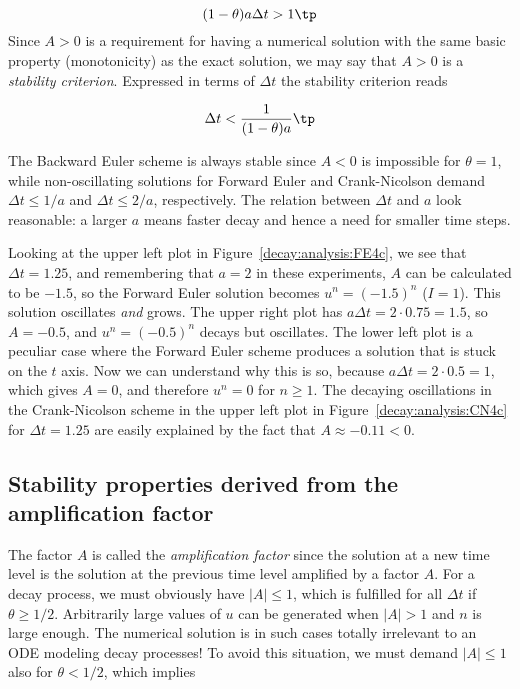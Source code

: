 \documentclass[graybox,sectrefs,envcountresetchap,open=right,final]{svmonodo}
\begin{document}
\begin{equation}
(1-\theta)a\Delta t > 1 \tp
\label{decay:th:stability}
\end{equation}
Since $A>0$ is a requirement for having a numerical solution with the
same basic property (monotonicity) as the exact solution, we may say
that $A>0$ is a \emph{stability criterion}. Expressed in terms of $\Delta t$
the stability criterion reads

\begin{equation}
\Delta t < \frac{1}{(1-\theta)a}\tp
\end{equation}

The Backward
Euler scheme is always stable since $A < 0$ is impossible for $\theta=1$, while
non-oscillating solutions for Forward Euler and Crank-Nicolson
demand $\Delta t\leq 1/a$ and $\Delta t\leq 2/a$, respectively.
The relation between $\Delta t$ and $a$ look reasonable: a larger
$a$ means faster decay and hence a need for smaller time steps.

Looking at the upper left plot in Figure~\ref{decay:analysis:FE4c},
we see that $\Delta t=1.25$, and remembering that $a=2$ in these
experiments, $A$ can be calculated to be
$-1.5$, so the Forward Euler solution becomes $u^n=(-1.5)^n$ ($I=1$).
This solution oscillates \emph{and} grows. The upper right plot has
$a\Delta t = 2\cdot 0.75=1.5$, so $A=-0.5$,
and $u^n=(-0.5)^n$ decays but oscillates. The lower left plot
is a peculiar case where the Forward Euler scheme produces a solution
that is stuck on the $t$ axis. Now we can understand why this is so,
because $a\Delta t= 2\cdot 0.5=1$, which gives $A=0$,
and therefore $u^n=0$ for $n\geq 1$.  The decaying oscillations in the Crank-Nicolson scheme in the upper left plot in Figure~\ref{decay:analysis:CN4c}
for $\Delta t=1.25$ are easily explained by the fact that $A\approx -0.11 < 0$.

\subsection{Stability properties derived from the amplification factor}

The factor $A$ is called the \emph{amplification factor} since the solution
at a new time level is the solution at the previous time
level amplified by a factor $A$.
For a decay process, we must obviously have $|A|\leq 1$, which
is fulfilled for all $\Delta t$ if $\theta \geq 1/2$. Arbitrarily
large values of $u$ can be generated when $|A|>1$ and $n$ is large
enough. The numerical solution is in such cases totally irrelevant to
an ODE modeling decay processes! To avoid this situation, we must
demand $|A|\leq 1$ also for $\theta < 1/2$, which implies
\end{document}

